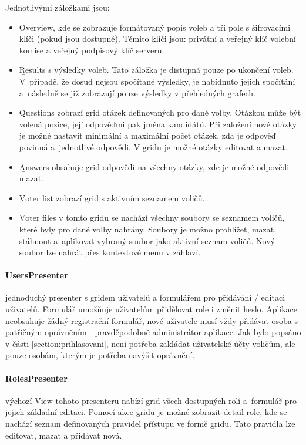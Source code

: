 Jednotlivými záložkami jsou:
\begin{itemize}
	\item \b{Overview}, kde se zobrazuje formátovaný popis voleb a tři pole s šifrovacími klíči (pokud jsou dostupné). Těmito klíči jsou: privátní a veřejný klíč volební komise a veřejný podpisový klíč serveru.
	\item \b{Results} s výsledky voleb. Tato záložka je distupná pouze po ukončení voleb. V~případě, že dosud nejsou spočítané výsledky, je nabídnuto jejich spočítání a~následně se již zobrazují pouze výsledky v přehledných grafech.
	\item \b{Questions} zobrazí grid otázek definovaných pro dané volby. Otázkou může být volená pozice, její odpověďmi pak jména kandidátů. Při založení nové otázky je možné nastavit minimální a maximální počet otázek, zda je odpověď povinná a~jednotlivé odpovědi. V gridu je možné otázky editovat a mazat.
	
	\item \b{Answers} obsahuje grid odpovědí na všechny otázky, zde je možné odpovědi mazat.
	
	\item \b{Voter list} zobrazí grid s aktivním seznamem voličů.
	
	\item \b{Voter files} v tomto gridu se nachází všechny soubory se seznamem voličů, které byly pro dané volby nahrány. Soubory je možno prohlížet, mazat, stáhnout a~aplikovat vybraný soubor jako aktivní seznam voličů. Nový soubor lze nahrát přes kontextové menu v záhlaví.
	
\end{itemize}

\paragraph{UsersPresenter} jednoduchý presenter s gridem uživatelů a formulářem pro přidávání / editaci uživatelů. Formulář umožňuje uživatelům přidělovat role i změnit heslo. Aplikace neobsahuje žádný registrační formulář, nové uživatele musí vždy přidávat osoba s patřičným oprávněním - pravděpodobně administrátor aplikace. Jak bylo popsáno v části \ref{section:prihlasovani}, není potřeba zakládat uživatelské účty voličům, ale pouze osobám, kterým je potřeba navýšit oprávnění.

\paragraph{RolesPresenter} výchozí View tohoto presenteru nabízí grid všech dostupných rolí a~formulář pro jejich základní editaci. Pomocí akce gridu je možné zobrazit detail role, kde se nachází seznam definovaných pravidel přístupu ve formě gridu. Tato pravidla lze editovat, mazat a přidávat nová.

